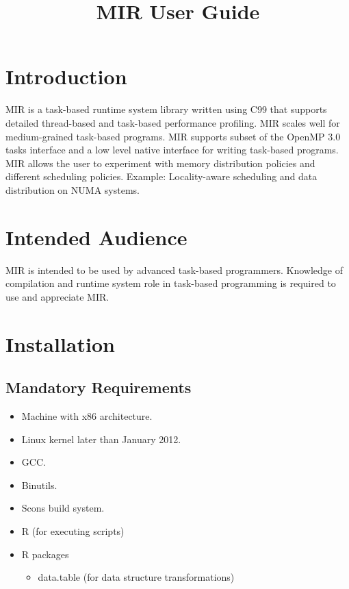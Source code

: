 \documentclass[11pt,a4paper]{article}
\title{MIR User Guide}
\begin{document}
\maketitle

\section{Introduction}\label{introduction}

MIR is a task-based runtime system library written using C99 that supports detailed thread-based and task-based performance profiling. MIR scales well for medium-grained task-based programs. MIR supports subset of the OpenMP 3.0 tasks interface and a low level native interface for writing task-based programs. MIR allows the user to experiment with memory distribution policies and different scheduling policies. Example: Locality-aware scheduling and data distribution on NUMA systems.

\section{Intended Audience}\label{intended-audience}

MIR is intended to be used by advanced task-based programmers. Knowledge of compilation and runtime system role in task-based programming is required to use and appreciate MIR.

\section{Installation}\label{installation}

\subsection{Mandatory Requirements}\label{mandatory-requirements}

\begin{itemize}
  \item Machine with x86 architecture.
  \item Linux kernel later than January 2012.
  \item GCC.
  \item Binutils.
  \item Scons build system.
  \item R (for executing scripts)
  \item R packages 
  \begin{itemize}
      \item data.table (for data structure transformations) 
  \end{itemize}
\end{itemize}
\end{document}
